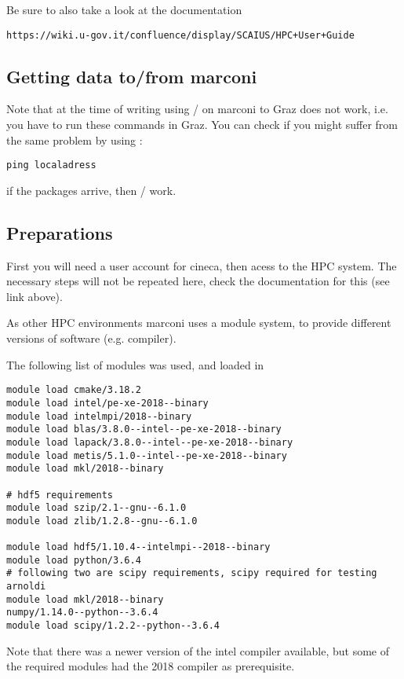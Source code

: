 \documentclass{article}
\newcommand{\vv}[1]{\texttt{\detokenize{#1}}}
\begin{document}
Be sure to also take a look at the documentation
\begin{verbatim}
https://wiki.u-gov.it/confluence/display/SCAIUS/HPC+User+Guide
\end{verbatim}

\subsection{Getting data to/from marconi}
Note that at the time of writing using \vv{scp}/\vv{rsync} on marconi to
Graz does not work, i.e. you have to run these commands in Graz.
You can check if you might suffer from the same problem by using \vv{ping}:
\begin{verbatim}
ping localadress
\end{verbatim}
if the packages arrive, then \vv{scp}/\vv{rsync} work.

\subsection{Preparations}
First you will need a user account for cineca, then acess to the HPC
system. The necessary steps will not be repeated here, check the
documentation for this (see link above).

As other HPC environments marconi uses a module system, to provide
different versions of software (e.g. compiler).

The following list of modules was used, and loaded in \vv{.bashrc}

\begin{verbatim}
module load cmake/3.18.2
module load intel/pe-xe-2018--binary
module load intelmpi/2018--binary
module load blas/3.8.0--intel--pe-xe-2018--binary
module load lapack/3.8.0--intel--pe-xe-2018--binary
module load metis/5.1.0--intel--pe-xe-2018--binary
module load mkl/2018--binary

# hdf5 requirements
module load szip/2.1--gnu--6.1.0
module load zlib/1.2.8--gnu--6.1.0

module load hdf5/1.10.4--intelmpi--2018--binary
module load python/3.6.4
# following two are scipy requirements, scipy required for testing arnoldi
module load mkl/2018--binary
numpy/1.14.0--python--3.6.4
module load scipy/1.2.2--python--3.6.4
\end{verbatim}

Note that there was a newer version of the intel compiler available,
but some of the required modules had the 2018 compiler as prerequisite.
\end{document}
